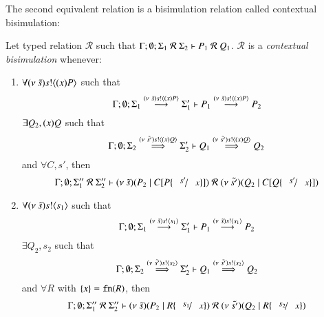 The second equivalent relation is a bisimulation relation called
contextual bisimulation:
\begin{definition}\rm
	Let typed relation $\mathcal{R}$ such that $\Gamma; \emptyset; \Sigma_1\ \mathcal{R}\ \Sigma_2 \proves P_1\ \mathcal{R}\ Q_1$.
	$\mathcal{R}$ is a {\em contextual bisimulation} whenever:
	\begin{enumerate}
		\item	$\forall (\nu\ \tilde{s}) s ! \langle (x)P \rangle$ such that
			\[
				\Gamma; \emptyset; \Sigma_1 \stackrel{(\nu\ \tilde{s}) s ! \langle (x)P \rangle}{\longrightarrow} \Sigma_1' \vdash P_1 \stackrel{(\nu\ \tilde{s}) s ! \langle (x)P \rangle}{\longrightarrow} P_2
			\]
			$\exists Q_2, (x)Q$ such that
			\[
				\Gamma; \emptyset; \Sigma_2 \stackrel{(\nu\ \tilde{s'}) s ! \langle (x)Q \rangle}{\Longrightarrow} \Sigma_2' \vdash Q_1 \stackrel{(\nu\ \tilde{s'}) s ! \langle (x)Q \rangle}{\Longrightarrow} Q_2
			\]
			and $\forall C, s'$, %
			then
			\[
				\Gamma; \emptyset; \Sigma_1''\ \mathcal{R}\ \Sigma_2'' \proves \newsp{\tilde{s}}{P_2 \Par \context{C}{P \subst{s'}{x}}}\ \mathcal{R}\ 
				\newsp{\tilde{s'}}{Q_2 \Par \context{C}{Q \subst{s'}{x}}}
			\]
		\item	$\forall (\nu\ \tilde{s}) s ! \langle s_1 \rangle$ such that
			\[
				\Gamma; \emptyset; \Sigma_1 \stackrel{(\nu\ \tilde{s}) s ! \langle s_1 \rangle}{\longrightarrow} \Sigma_1' \vdash P_1 \stackrel{(\nu\ \tilde{s}) s ! \langle s_1 \rangle}{\longrightarrow} P_2
			\]
			$\exists Q_2, s_2$ such that
			\[
				\Gamma; \emptyset; \Sigma_2 \stackrel{(\nu\ \tilde{s'}) s ! \langle s_2 \rangle}{\Longrightarrow} \Sigma_2' \vdash Q_1 \stackrel{(\nu\ \tilde{s'}) s ! \langle s_2 \rangle}{\Longrightarrow} Q_2
			\]
			and $\forall R$ with $\{x\} = \mathtt{fn}(R)$, %
			then
			\[
				\Gamma; \emptyset; \Sigma_1''\ \mathcal{R}\ \Sigma_2'' \proves \newsp{\tilde{s}}{P_2 \Par R \subst{s_1}{x}}\ \mathcal{R}\ 
				\newsp{\tilde{s'}}{Q_2 \Par R \subst{s_2}{x}}
			\]


\end{enumerate}
\end{definition}
